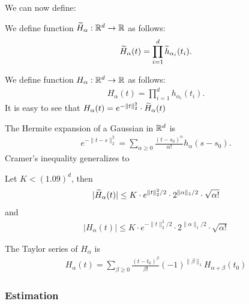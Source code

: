 We can now define:
\begin{definition}
We define function $\widetilde{H}_{\alpha} : {\mathbb R}^d \rightarrow {\mathbb R}$ as follows:
\begin{align*}
\widetilde{H}_{\alpha}(t) = \prod_{i=1}^d \widetilde{h}_{\alpha_i} (t_i) .
\end{align*}
\end{definition}


\begin{definition}
We define function $H_{\alpha} : {\mathbb R}^d \rightarrow {\mathbb R}$ as follows:
\begin{align*}
H_{\alpha}(t) = \prod_{i=1}^d h_{\alpha_i}(t_i). 
\end{align*}
It is easy to see that $ H_{\alpha}(t) = e^{ - \| t \|_2^2 } \cdot \widetilde{H}_{\alpha}(t)$
\end{definition}

The Hermite expansion of a Gaussian in ${\mathbb R}^d$ is
\begin{align}\label{eq:hermite_expansion_of_gaussian}
e^{- \| t - s \|_2^2 } = \sum_{ \alpha \geq 0 } \frac{ ( t - s_0 )^{\alpha} }{ \alpha ! } h_{\alpha} ( s - s_0 ).
\end{align}
Cramer's inequality generalizes to
\begin{lemma}\label{lem:cramer_inequality}
Let $K<(1.09)^d$, then
\begin{align*}
 | \widetilde{H}_{\alpha} (t) | \leq K \cdot e^{ \| t \|_2^2 / 2 } \cdot 2^{ \| \alpha \|_1 /2 } \cdot \sqrt{ \alpha ! } 
\end{align*}
and 
\begin{align*}
 | H_{\alpha} (t) | \leq K \cdot e^{ - \| t \|_2^2 / 2 } \cdot 2^{ \| \alpha \|_1 /2 } \cdot \sqrt{ \alpha ! } 
\end{align*}
\end{lemma}

The Taylor series of $H_{\alpha}$ is
\begin{align}\label{eq:taylor_series_of_H_t}
H_{\alpha}(t) = \sum_{\beta \geq 0} \frac{ (t-t_0)^{\beta} }{ \beta ! } (-1)^{\| \beta \|_1} H_{\alpha + \beta} (t_0)
\end{align}




\subsubsection{Estimation}


